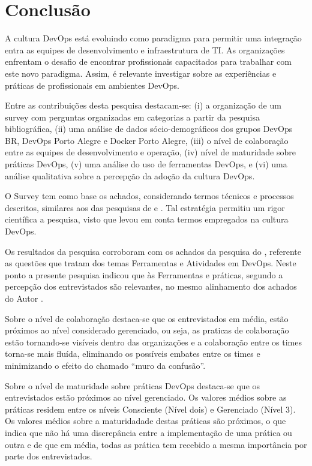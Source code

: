 \documentclass[twoside,english,brazilian]{UNISINOSartigo}
\begin{document}
\section{Conclusão}
A cultura DevOps está evoluindo como paradigma para permitir uma integração entra as equipes de desenvolvimento e infraestrutura de TI. As organizações enfrentam o desafio de encontrar profissionais capacitados para trabalhar com este novo paradigma. Assim, é relevante investigar sobre as experiências e práticas de profissionais em ambientes DevOps.

Entre as contribuições desta pesquisa destacam-se: (i) a organização de um survey com perguntas organizadas em categorias a partir da pesquisa bibliográfica, (ii) uma análise de dados sócio-demográficos dos grupos DevOps BR, DevOps Porto Alegre e Docker Porto Alegre, (iii) o nível de colaboração entre as equipes de desenvolvimento e operação, (iv) nível de maturidade sobre práticas DevOps, (v) uma análise do uso de ferramentas DevOps, e (vi) uma análise qualitativa sobre a percepção da adoção da cultura DevOps.

O Survey tem como base os achados, considerando termos técnicos e processos descritos, similares aos das pesquisas de  e . Tal estratégia permitiu um rigor científica a pesquisa, visto que levou em conta termos empregados na cultura DevOps. 

Os resultados da pesquisa corroboram com os achados da pesquisa do , referente as questões que tratam dos temas Ferramentas e Atividades em DevOps. Neste ponto a presente pesquisa indicou que às Ferramentas e práticas, segundo a percepção dos entrevistados são relevantes, no mesmo alinhamento dos achados do Autor .

Sobre o nível de colaboração destaca-se que os entrevistados em média, estão próximos ao nível considerado gerenciado, ou seja, as praticas de colaboração estão tornando-se visíveis dentro das organizações e a colaboração entre os times torna-se mais fluída, eliminando os possíveis embates entre os times e minimizando o efeito do chamado ``muro da confusão''. 

Sobre o nível de maturidade sobre práticas DevOps destaca-se que os entrevistados estão próximos ao nível gerenciado. Os valores médios sobre as práticas residem entre os níveis Consciente (Nível dois) e Gerenciado (Nível 3). Os valores médios sobre a maturidadade destas práticas são próximos, o que indica que não há uma discrepância entre a implementação de uma prática ou outra e de que em média, todas as prática tem recebido a mesma importância por parte dos entrevistados.
\end{document}
